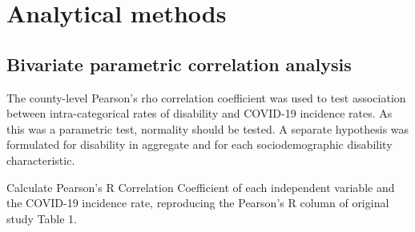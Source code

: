 \documentclass[
]{article}
\begin{document}
\hypertarget{analytical-methods}{%
\section{Analytical methods}\label{analytical-methods}}

\hypertarget{bivariate-parametric-correlation-analysis}{%
\subsection{Bivariate parametric correlation
analysis}\label{bivariate-parametric-correlation-analysis}}

The county-level Pearson's rho correlation coefficient was used to test
association between intra-categorical rates of disability and COVID-19
incidence rates. As this was a parametric test, normality should be
tested. A separate hypothesis was formulated for disability in aggregate
and for each sociodemographic disability characteristic.

Calculate Pearson's R Correlation Coefficient of each independent
variable and the COVID-19 incidence rate, reproducing the Pearson's R
column of original study Table 1.
\end{document}
